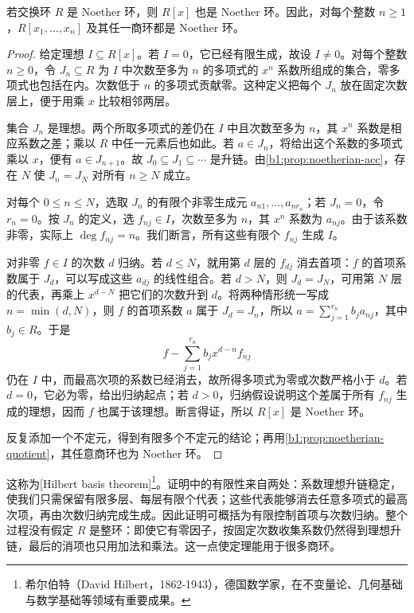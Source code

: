 \begin{theorem}\label{b1:thm:hilbert-basis}
	若交换环 \(R\) 是 Noether 环，则 \(R[x]\) 也是 Noether 环。因此，对每个整数 \(n\geq1\)，\(R[x_1,\ldots,x_n]\) 及其任一商环都是 Noether 环。
\end{theorem}
\begin{proof}
	给定理想 \(I\subseteq R[x]\)。若 \(I=0\)，它已经有限生成，故设 \(I\ne0\)。对每个整数 \(n\ge0\)，令 \(J_n\subseteq R\) 为 \(I\) 中次数至多为 \(n\) 的多项式的 \(x^n\) 系数所组成的集合，零多项式也包括在内。次数低于 \(n\) 的多项式贡献零。这种定义把每个 \(J_n\) 放在固定次数层上，便于用乘 \(x\) 比较相邻两层。

	集合 \(J_n\) 是理想。两个所取多项式的差仍在 \(I\) 中且次数至多为 \(n\)，其 \(x^n\) 系数是相应系数之差；乘以 \(R\) 中任一元素后也如此。若 \(a\in J_n\)，将给出这个系数的多项式乘以 \(x\)，便有 \(a\in J_{n+1}\)。故 \(J_0\subseteq J_1\subseteq\cdots\) 是升链。由\cref{b1:prop:noetherian-acc}，存在 \(N\) 使 \(J_n=J_N\) 对所有 \(n\ge N\) 成立。

	对每个 \(0\le n\le N\)，选取 \(J_n\) 的有限个非零生成元 \(a_{n1},\ldots,a_{nr_n}\)；若 \(J_n=0\)，令 \(r_n=0\)。按 \(J_n\) 的定义，选 \(f_{nj}\in I\)，次数至多为 \(n\)，其 \(x^n\) 系数为 \(a_{nj}\)。由于该系数非零，实际上 \(\deg f_{nj}=n\)。我们断言，所有这些有限个 \(f_{nj}\) 生成 \(I\)。

	对非零 \(f\in I\) 的次数 \(d\) 归纳。若 \(d\le N\)，就用第 \(d\) 层的 \(f_{dj}\) 消去首项：\(f\) 的首项系数属于 \(J_d\)，可以写成这些 \(a_{dj}\) 的线性组合。若 \(d>N\)，则 \(J_d=J_N\)，可用第 \(N\) 层的代表，再乘上 \(x^{d-N}\) 把它们的次数升到 \(d\)。将两种情形统一写成 \(n=\min(d,N)\)，则 \(f\) 的首项系数 \(a\) 属于 \(J_d=J_n\)，所以 \(a=\sum_{j=1}^{r_n}b_j a_{nj}\)，其中 \(b_j\in R\)。于是
	\[
		f-\sum_{j=1}^{r_n}b_jx^{d-n}f_{nj}
	\]
	仍在 \(I\) 中，而最高次项的系数已经消去，故所得多项式为零或次数严格小于 \(d\)。若 \(d=0\)，它必为零，给出归纳起点；若 \(d>0\)，归纳假设说明这个差属于所有 \(f_{nj}\) 生成的理想，因而 \(f\) 也属于该理想。断言得证，所以 \(R[x]\) 是 Noether 环。

	反复添加一个不定元，得到有限多个不定元的结论；再用\cref{b1:prop:noetherian-quotient}，其任意商环也为 Noether 环。
\end{proof}

这称为[Hilbert basis theorem]\footnote{希尔伯特（David Hilbert，1862-1943），德国数学家，在不变量论、几何基础与数学基础等领域有重要成果。}。证明中的有限性来自两处：系数理想升链稳定，使我们只需保留有限多层、每层有限个代表；这些代表能够消去任意多项式的最高次项，再由次数归纳完成生成。因此证明可概括为有限控制首项与次数归纳。整个过程没有假定 \(R\) 是整环：即使它有零因子，按固定次数收集系数仍然得到理想升链，最后的消项也只用加法和乘法。这一点使定理能用于很多商环。


